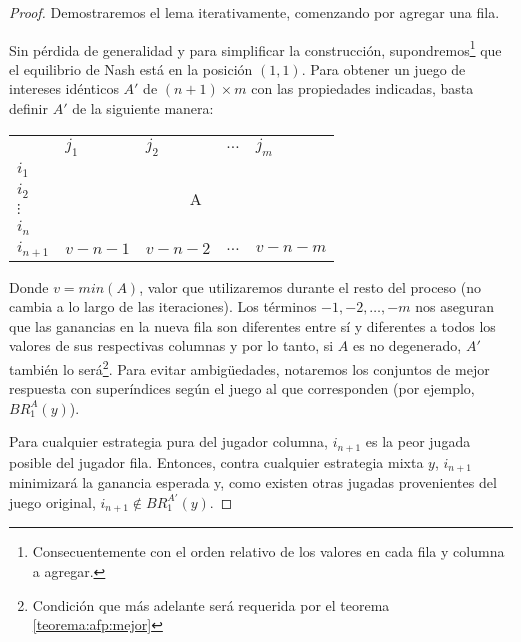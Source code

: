 \begin{proof}
    Demostraremos el lema iterativamente, comenzando por agregar una fila.
    
    Sin pérdida de generalidad y para simplificar la construcción, supondremos\footnote{Consecuentemente con el orden relativo de los valores en cada fila y columna a agregar.} que el equilibrio de Nash está en la posición $(1,1)$. Para obtener un juego de intereses idénticos $A'$ de $(n+1)\times m$ con las propiedades indicadas, basta definir $A'$ de la siguiente manera:
    \begin{center}
        \begin{tabular}{lllll}
                                        & $j_1$       & $j_2$       & $\dots$ & $j_m$                            \\ \cline{2-5} 
            \multicolumn{1}{l|}{$i_1$}     & \multicolumn{4}{c|}{\multirow{4}{*}{\huge {A}}}                \\
            \multicolumn{1}{l|}{$i_2$}     & \multicolumn{4}{c|}{}                                                  \\
            \multicolumn{1}{l|}{$\vdots$}  & \multicolumn{4}{c|}{}                                                  \\
            \multicolumn{1}{l|}{$i_n$}     & \multicolumn{4}{c|}{}                                                  \\ \cline{2-5} 
            \multicolumn{1}{l|}{$i_{n+1}$} & $v - n - 1$ & $v - n - 2$ & $\dots$ & \multicolumn{1}{l|}{$v - n - m$} \\ \cline{2-5} 
        \end{tabular}
    \end{center}

    Donde $v = min(A)$, valor que utilizaremos durante el resto del proceso (no cambia a lo largo de las iteraciones). Los términos $-1, -2, \dots, -m$ nos aseguran que las ganancias en la nueva fila son diferentes entre sí y diferentes a todos los valores de sus respectivas columnas y por lo tanto, si $A$ es no degenerado, $A'$ también lo será\footnote{Condición que más adelante será requerida por el teorema \ref{teorema:afp:mejor}}. Para evitar ambigüedades, notaremos los conjuntos de mejor respuesta con superíndices según el juego al que corresponden (por ejemplo, $BR_1^A(y)$).

    Para cualquier estrategia pura del jugador columna, $i_{n+1}$ es la peor jugada posible del jugador fila. Entonces, contra cualquier estrategia mixta $y$, $i_{n+1}$ minimizará la ganancia esperada y, como existen otras jugadas provenientes del juego original, $i_{n+1} \notin BR_1^{A'}(y)$.
    

\end{proof}
